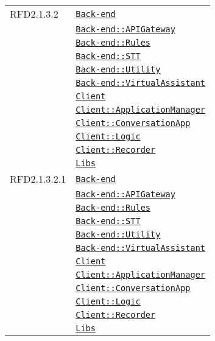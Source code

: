 \begin{longtable}{|>{\centering}m{3cm}|m{10cm}<{\centering}|}
RFD2.1.3.2 & \hyperref[Back-end]{\texttt{Back-end}}\\
& \hyperref[Back-end::APIGateway]{\texttt{Back-end::APIGateway}}\\
& \hyperref[Back-end::Rules]{\texttt{Back-end::Rules}}\\
& \hyperref[Back-end::STT]{\texttt{Back-end::STT}}\\
& \hyperref[Back-end::Utility]{\texttt{Back-end::Utility}}\\
& \hyperref[Back-end::VirtualAssistant]{\texttt{Back-end::VirtualAssistant}}\\
& \hyperref[Client]{\texttt{Client}}\\
& \hyperref[Client::ApplicationManager]{\texttt{Client::ApplicationManager}}\\
& \hyperref[Client::ConversationApp]{\texttt{Client::ConversationApp}}\\
& \hyperref[Client::Logic]{\texttt{Client::Logic}}\\
& \hyperref[Client::Recorder]{\texttt{Client::Recorder}}\\
& \hyperref[Libs]{\texttt{Libs}}\\ \hline

RFD2.1.3.2.1 & \hyperref[Back-end]{\texttt{Back-end}}\\
& \hyperref[Back-end::APIGateway]{\texttt{Back-end::APIGateway}}\\
& \hyperref[Back-end::Rules]{\texttt{Back-end::Rules}}\\
& \hyperref[Back-end::STT]{\texttt{Back-end::STT}}\\
& \hyperref[Back-end::Utility]{\texttt{Back-end::Utility}}\\
& \hyperref[Back-end::VirtualAssistant]{\texttt{Back-end::VirtualAssistant}}\\
& \hyperref[Client]{\texttt{Client}}\\
& \hyperref[Client::ApplicationManager]{\texttt{Client::ApplicationManager}}\\
& \hyperref[Client::ConversationApp]{\texttt{Client::ConversationApp}}\\
& \hyperref[Client::Logic]{\texttt{Client::Logic}}\\
& \hyperref[Client::Recorder]{\texttt{Client::Recorder}}\\
& \hyperref[Libs]{\texttt{Libs}}\\ \hline


\end{longtable}
